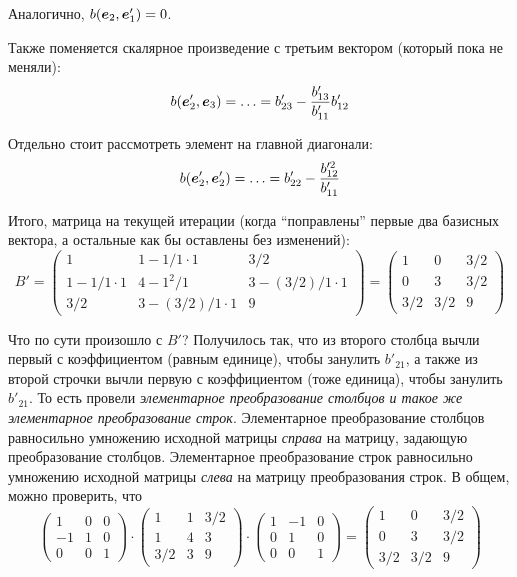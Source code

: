 \documentclass[a4paper,12pt]{article}
\begin{document}
\begin{example}
    Аналогично, $b(\bds e_2, \bds e_1') \hm= 0$.
    
    Также поменяется скалярное произведение с третьим вектором (который пока не меняли):
    \[
      b(\boldsymbol e_2', \boldsymbol e_3) = \ldots = b'_{23} - \frac{b'_{13}}{b'_{11}} b'_{12}
    \]
    
    Отдельно стоит рассмотреть элемент на главной диагонали:
    \[
      b(\boldsymbol e_2', \boldsymbol e_2') = \ldots = b'_{22} - \frac{b_{12}^{\prime 2}}{b'_{11}}
    \]
    
    Итого, матрица на текущей итерации (когда ``поправлены'' первые два базисных вектора, а остальные как бы оставлены без изменений):
    \[
      B' = \begin{pmatrix}
        1               & 1 - 1/1 \cdot 1     & 3/2\\
        1 - 1/1 \cdot 1 & 4 - 1^2/1           & 3 - (3/2)/1 \cdot 1 \\
        3/2             & 3 - (3/2)/1 \cdot 1 & 9
      \end{pmatrix} = \begin{pmatrix}
        1   & 0   & 3/2\\
        0   & 3   & 3/2\\
        3/2 & 3/2 & 9
      \end{pmatrix}
    \]
    
    Что по сути произошло с $B'$?
    Получилось так, что из второго столбца вычли первый с коэффициентом (равным единице), чтобы занулить $b'_{21}$, а также из второй строчки вычли первую с коэффициентом (тоже единица), чтобы занулить $b'_{21}$.
    То есть провели \emph{элементарное преобразование столбцов и такое же элементарное преобразование строк}.
    Элементарное преобразование столбцов равносильно умножению исходной матрицы \emph{справа} на матрицу, задающую преобразование столбцов.
    Элементарное преобразование строк равносильно умножению исходной матрицы \emph{слева} на матрицу преобразования строк.
    В общем, можно проверить, что
    \[
      \begin{pmatrix}
        1  & 0 & 0\\
        -1 & 1 & 0\\
        0  & 0 & 1
      \end{pmatrix} \cdot \begin{pmatrix}
        1   & 1 & 3/2\\
        1   & 4 & 3\\
        3/2 & 3 & 9
      \end{pmatrix} \cdot \begin{pmatrix}
        1 & -1 & 0\\
        0 & 1  & 0\\
        0 & 0  & 1
      \end{pmatrix} = \begin{pmatrix}
        1   & 0   & 3/2\\
        0   & 3   & 3/2\\
        3/2 & 3/2 & 9
      \end{pmatrix}
    \]
    

\end{example}
\end{document}
